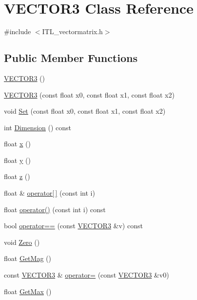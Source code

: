 \hypertarget{classVECTOR3}{
\section{VECTOR3 Class Reference}
\label{classVECTOR3}
}


{\ttfamily \#include $<$ITL\_\-vectormatrix.h$>$}

\subsection*{Public Member Functions}
\begin{DoxyCompactItemize}
\item 
\hyperlink{classVECTOR3_a67df11517cf0d5f78bc4fbf7c8428c74}{VECTOR3} ()
\item 
\hyperlink{classVECTOR3_a36d21006a60aab59533ad9ef1f0dbec0}{VECTOR3} (const float x0, const float x1, const float x2)
\item 
void \hyperlink{classVECTOR3_a032256fc81e39310d30a38fb303ce48f}{Set} (const float x0, const float x1, const float x2)
\item 
int \hyperlink{classVECTOR3_a0f24d4dfcad2cf3bb11caa5a8f3bb758}{Dimension} () const 
\item 
float \hyperlink{classVECTOR3_ac05d9ef1b78723c720085c2d914bf504}{x} ()
\item 
float \hyperlink{classVECTOR3_aa6d52065fe15476ad2f169f93e8e4539}{y} ()
\item 
float \hyperlink{classVECTOR3_a8962966f79d06da320d958555cd7c98e}{z} ()
\item 
float \& \hyperlink{classVECTOR3_ad036f6898236422beeb85ea329ee510f}{operator\mbox{[}$\,$\mbox{]}} (const int i)
\item 
float \hyperlink{classVECTOR3_a3ed6b977aafcd21ffca8bbc081a55694}{operator()} (const int i) const 
\item 
bool \hyperlink{classVECTOR3_a4fd7d880a7bdab66567d23dccaaf27d4}{operator==} (const \hyperlink{classVECTOR3}{VECTOR3} \&v) const 
\item 
void \hyperlink{classVECTOR3_a55e86265b134a80232d1fb4f8857d3e2}{Zero} ()
\item 
float \hyperlink{classVECTOR3_ad0453425d5ddd7acc41e779e58292c82}{GetMag} ()
\item 
const \hyperlink{classVECTOR3}{VECTOR3} \& \hyperlink{classVECTOR3_a09838095d5261acb5d316ff1b1748c6a}{operator=} (const \hyperlink{classVECTOR3}{VECTOR3} \&v0)
\item 
float \hyperlink{classVECTOR3_ad3d4922b7faecfbf09a04e7ec63f8b97}{GetMax} ()

\end{DoxyCompactItemize}
